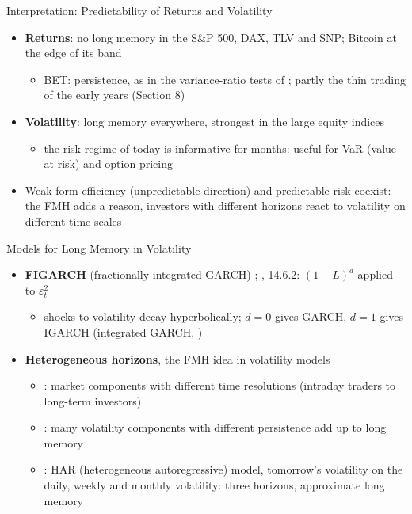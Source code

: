 \begin{frame}{Interpretation: Predictability of Returns and Volatility}
\itemsize{\small}
\begin{itemize}
    \item \textbf{Returns}: no long memory in the S\&P 500, DAX, TLV and SNP; Bitcoin at the edge of its band
    \begin{itemize}
        \item BET: persistence, as in the variance-ratio tests of ; partly the thin trading of the early years (Section 8)
    \end{itemize}
    \item \textbf{Volatility}: long memory everywhere, strongest in the large equity indices
    \begin{itemize}
        \item the risk regime of today is informative for months: useful for VaR (value at risk) and option pricing
    \end{itemize}
    \item Weak-form efficiency (unpredictable direction) and predictable risk coexist: the FMH adds a reason, investors with different horizons react to volatility on different time scales
\end{itemize}
\end{frame}

\begin{frame}{Models for Long Memory in Volatility}
\itemsize{\small}
\begin{itemize}
    \item \textbf{FIGARCH} (fractionally integrated GARCH) ; , 14.6.2: $(1 - L)^d$ applied to $\varepsilon_t^2$
    \begin{itemize}
        \item shocks to volatility decay hyperbolically; $d = 0$ gives GARCH, $d = 1$ gives IGARCH (integrated GARCH, )
    \end{itemize}
    \item \textbf{Heterogeneous horizons}, the FMH idea in volatility models
    \begin{itemize}
        \item {}: market components with different time resolutions (intraday traders to long-term investors)
        \item {}: many volatility components with different persistence add up to long memory
        \item {}: HAR (heterogeneous autoregressive) model, tomorrow's volatility on the daily, weekly and monthly volatility: three horizons, approximate long memory
    \end{itemize}
\end{itemize}
\end{frame}


